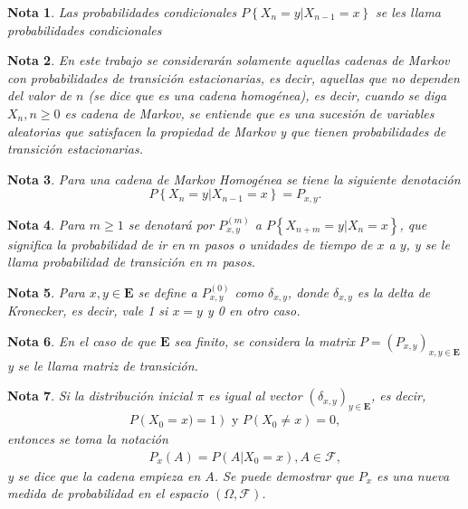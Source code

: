 \documentclass{article}
\newtheorem{Note}{Nota}[section]
\numberwithin{equation}{section}
\begin{document}
\begin{Note}
Las probabilidades condicionales $P\left\{X_{n}=y|X_{n-1}=x\right\}$ se les llama \textit{probabilidades condicionales}
\end{Note}

\begin{Note}
En este trabajo se considerar\'an solamente aquellas cadenas de Markov con probabilidades de transici\'on estacionarias, es decir, aquellas que no dependen del valor de $n$ (se dice que es una cadena homog\'enea), es decir, cuando se diga $X_{n},n\geq0$ es cadena de Markov, se entiende que es una sucesi\'on de variables aleatorias que satisfacen la propiedad de Markov y que tienen probabilidades de transici\'on estacionarias.
\end{Note}

\begin{Note}
Para una cadena de Markov Homog\'enea se tiene la siguiente denotaci\'on
\begin{equation}
P\left\{X_{n}=y|X_{n-1}=x\right\}=P_{x,y}.
\end{equation}
\end{Note}

\begin{Note}
Para $m\geq1$ se denotar\'a por $P^{(m)}_{x,y}$ a $P\left\{X_{n+m}=y|X_{n}=x\right\}$, que significa la probabilidad de ir en $m$ pasos o unidades de tiempo de $x$ a $y$, y se le llama \textit{probabilidad de transici\'on en $m$ pasos}.
\end{Note}

\begin{Note}
Para $x,y\in\mathbf{E}$ se define a $P^{(0)}_{x,y}$ como $\delta_{x,y}$, donde $\delta_{x,y}$ es la delta de Kronecker, es decir, vale 1 si $x=y$ y 0 en otro caso.
\end{Note}


\begin{Note}
En el caso de que $\mathbf{E}$ sea finito, se considera la matrix $P=\left(P_{x,y}\right)_{x,y\in \mathbf{E}}$ y se le llama \textit{matriz de transici\'on}.
\end{Note}


\begin{Note}
Si la distribuci\'on inicial $\pi$ es igual al vector $\left(\delta_{x,y}\right)_{y\in\mathbf{E}}$, es decir,
\begin{eqnarray*}
P\left(X_{0}=x)=1\right)\textrm{ y }P\left(X_{0}\neq x\right)=0,
\end{eqnarray*}
entonces se toma la notaci\'on 
\begin{eqnarray}
&&P_{x}\left(A\right)=P\left(A|X_{0}=x\right),A\in\mathcal{F},
\end{eqnarray}
y se dice que la cadena empieza en $A$. Se puede demostrar que $P_{x}$ es una nueva medida de probabilidad en el espacio $\left(\Omega,\mathcal{F}\right)$.
\end{Note}
\end{document}
